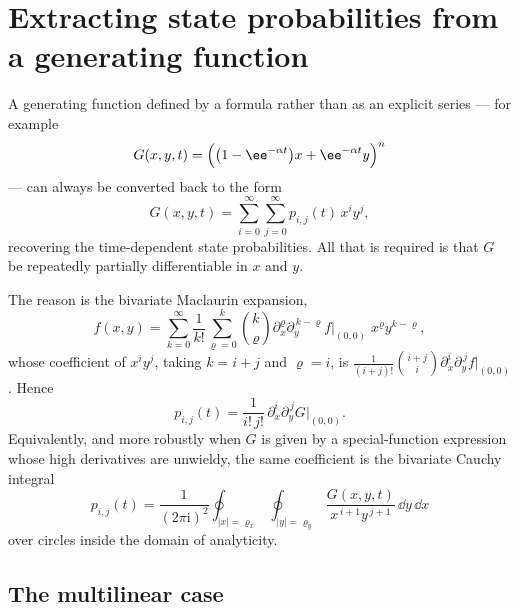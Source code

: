 \section{Extracting state probabilities from a generating function}
\label{m:app:extract}

A generating function defined by a formula rather than as an explicit series --- for
example
\begin{equation}
\label{m:eq:examplePgf}
G(x,y,t) = \Bigl(\bigl(1-\ee^{-\alpha t}\bigr)x + \ee^{-\alpha t}y\Bigr)^n
\end{equation}
--- can always be converted back to the form
\begin{equation}
\label{m:eq:series1}
G(x,y,t) = \sum_{i=0}^{\infty}\sum_{j=0}^{\infty}p_{i,j}(t)\,x^iy^j ,
\end{equation}
recovering the time-dependent state probabilities. All that is required is that $G$
be repeatedly partially differentiable in $x$ and $y$.

The reason is the bivariate Maclaurin expansion,
\begin{equation*}
f(x,y) = \sum_{k=0}^{\infty}\frac{1}{k!}\sum_{\varrho=0}^{k}\binom{k}{\varrho}
\partial_x^{\varrho}\partial_y^{\,k-\varrho}f\Big|_{(0,0)}\;x^{\varrho}y^{k-\varrho},
\end{equation*}
whose coefficient of $x^iy^j$, taking $k=i+j$ and $\varrho=i$, is
$\frac{1}{(i+j)!}\binom{i+j}{i}\partial_x^i\partial_y^{\,j}f\big|_{(0,0)}$. Hence
\begin{equation}
\label{m:eq:stateProb}
p_{i,j}(t) = \frac{1}{i!\,j!}\,\partial_x^i\partial_y^{\,j}G\Big|_{(0,0)} .
\end{equation}
Equivalently, and more robustly when $G$ is given by a special-function expression
whose high derivatives are unwieldy, the same coefficient is the bivariate Cauchy
integral
\begin{equation}
\label{m:eq:bivariateCauchy}
p_{i,j}(t) = \frac{1}{(2\pi\mathrm i)^2}
\oint_{|x|=\varrho_x}\oint_{|y|=\varrho_y}
\frac{G(x,y,t)}{x^{\,i+1}y^{\,j+1}}\,\dd y\,\dd x
\end{equation}
over circles inside the domain of analyticity.

\subsection*{The multilinear case}

